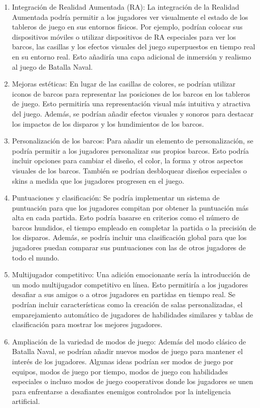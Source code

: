 \documentclass[a4paper, openright, 12pt]{article}
\begin{document}
\begin{enumerate}
    \item Integración de Realidad Aumentada (RA): La integración de la Realidad Aumentada podría permitir a los jugadores ver visualmente el estado de los tableros de juego en sus entornos físicos. Por ejemplo, podrían colocar sus dispositivos móviles o utilizar dispositivos de RA especiales para ver los barcos, las casillas y los efectos visuales del juego superpuestos en tiempo real en su entorno real. Esto añadiría una capa adicional de inmersión y realismo al juego de Batalla Naval.
    \item Mejoras estéticas: En lugar de las casillas de colores, se podrían utilizar iconos de barcos para representar las posiciones de los barcos en los tableros de juego. Esto permitiría una representación visual más intuitiva y atractiva del juego. Además, se podrían añadir efectos visuales y sonoros para destacar los impactos de los disparos y los hundimientos de los barcos.

    \item Personalización de los barcos: Para añadir un elemento de personalización, se podría permitir a los jugadores personalizar sus propios barcos. Esto podría incluir opciones para cambiar el diseño, el color, la forma y otros aspectos visuales de los barcos. También se podrían desbloquear diseños especiales o skins a medida que los jugadores progresen en el juego.
    
    \item Puntuaciones y clasificación: Se podría implementar un sistema de puntuación para que los jugadores compitan por obtener la puntuación más alta en cada partida. Esto podría basarse en criterios como el número de barcos hundidos, el tiempo empleado en completar la partida o la precisión de los disparos. Además, se podría incluir una clasificación global para que los jugadores puedan comparar sus puntuaciones con las de otros jugadores de todo el mundo.
    
    \item Multijugador competitivo: Una adición emocionante sería la introducción de un modo multijugador competitivo en línea. Esto permitiría a los jugadores desafiar a sus amigos o a otros jugadores en partidas en tiempo real. Se podrían incluir características como la creación de salas personalizadas, el emparejamiento automático de jugadores de habilidades similares y tablas de clasificación para mostrar los mejores jugadores.
    
    \item Ampliación de la variedad de modos de juego: Además del modo clásico de Batalla Naval, se podrían añadir nuevos modos de juego para mantener el interés de los jugadores. Algunas ideas podrían ser modos de juego por equipos, modos de juego por tiempo, modos de juego con habilidades especiales o incluso modos de juego cooperativos donde los jugadores se unen para enfrentarse a desafiantes enemigos controlados por la inteligencia artificial.
    
\end{enumerate}

\newpage



\end{document}
